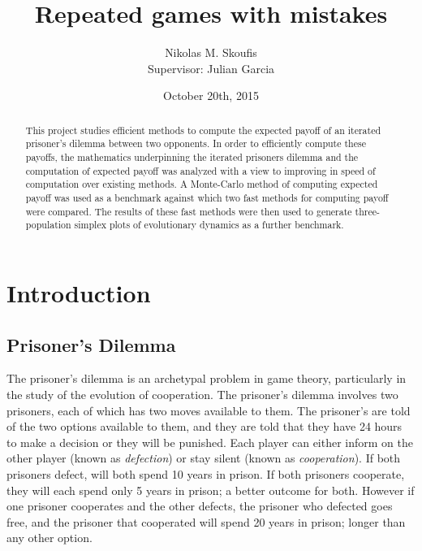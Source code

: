 \documentclass[a4paper,12pt]{article}
\begin{document}
\title{Repeated games with mistakes}
\author{Nikolas M. Skoufis \\ Supervisor: Julian Garcia}
\date{October 20th, 2015}

\maketitle

\begin{abstract}

This project studies efficient methods to compute the expected payoff of an iterated prisoner's dilemma between two opponents.
In order to efficiently compute these payoffs, the mathematics underpinning the iterated prisoners dilemma and the computation of expected payoff was analyzed with a view to improving in speed of computation over existing methods.
A Monte-Carlo method of computing expected payoff was used as a benchmark against which two fast methods for computing payoff were compared.
The results of these fast methods were then used to generate three-population simplex plots of evolutionary dynamics as a further benchmark.

\end{abstract}

\section{Introduction}

\subsection{Prisoner's Dilemma}

The prisoner's dilemma is an archetypal problem in game theory, particularly in the study of the evolution of cooperation.
The prisoner's dilemma involves two prisoners, each of which has two moves available to them.
The prisoner's are told of the two options available to them, and they are told that they have 24 hours to make a decision or they will be punished.
Each player can either inform on the other player (known as \textit{defection}) or stay silent (known as \textit{cooperation}).
If both prisoners defect, will both spend 10 years in prison.
If both prisoners cooperate, they will each spend only 5 years in prison; a better outcome for both.
However if one prisoner cooperates and the other defects, the prisoner who defected goes free, and the prisoner that cooperated will spend 20 years in prison; longer than any other option.
\end{document}
